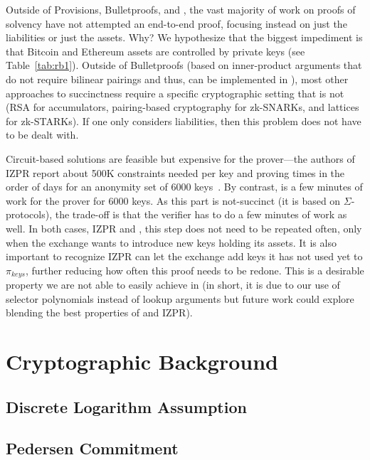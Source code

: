 Outside of Provisions, Bulletproofs, and \Sys, the vast majority of work on proofs of solvency have not attempted an end-to-end proof, focusing instead on just the liabilities or just the assets. Why? We hypothesize that the biggest impediment is that Bitcoin and Ethereum assets are controlled by \secp private keys (see Table~\ref{tab:rb1}). Outside of Bulletproofs (based on inner-product arguments that do not require bilinear pairings and thus, can be implemented in \secp), most other approaches to succinctness require a specific cryptographic setting that is not \secp (\ie RSA for accumulators, pairing-based cryptography for zk-SNARKs, and lattices for zk-STARKs). If one only considers liabilities, then this problem does not have to be dealt with.

Circuit-based solutions are feasible but expensive for the prover---the authors of IZPR report about 500K constraints needed per key and proving times in the order of days for an anonymity set of 6000 keys~\cite{izpr}. By contrast, \Sys is a few minutes of work for the prover for 6000 keys. As this part is not-succinct (it is based on $\Sigma$-protocols), the trade-off is that the verifier has to do a few minutes of work as well. In both cases, IZPR and \Sys, this step does not need to be repeated often, only when the exchange wants to introduce new keys holding its assets. It is also important to recognize IZPR can let the exchange add keys it has not used yet to $\pi_{keys}$, further reducing how often this proof needs to be redone. This is a desirable property we are not able to easily achieve in \Sys (in short, it is due to our  use of selector polynomials instead of lookup arguments but future work could explore blending the best properties of \Sys and IZPR). 


\section{Cryptographic Background}

\subsection{Discrete Logarithm Assumption}

\subsection{Pedersen Commitment}


